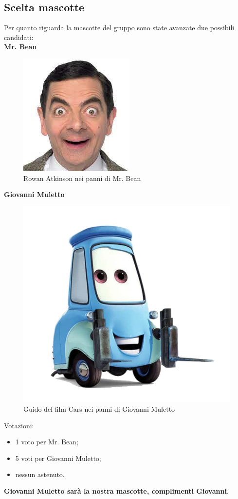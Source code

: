 \subsection{Scelta mascotte}
Per quanto riguarda la mascotte del gruppo sono state avanzate due possibili candidati:\\
\textbf{Mr. Bean}\\
\begin{figure}[H]
	\centering
	\includegraphics[scale=0.40]{res/images/mrbean.png}
	\caption{Rowan Atkinson nei panni di Mr. Bean}
\end{figure}
\textbf{Giovanni Muletto}\\
\begin{figure}[H]
	\centering
	\includegraphics[scale=0.20]{res/images/giovannimuletto.png}
	\caption{Guido del film Cars nei panni di Giovanni Muletto}
\end{figure}
Votazioni:
\begin{itemize}
	\item 1 voto per Mr. Bean;
	\item 5 voti per Giovanni Muletto;
	\item nessun astenuto.
\end{itemize}
\textbf{Giovanni Muletto sarà la nostra mascotte, complimenti Giovanni}.




